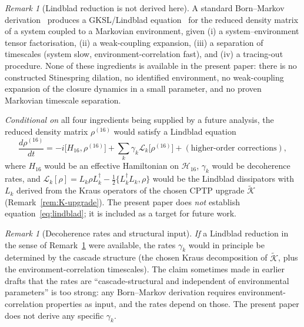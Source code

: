 \documentclass[12pt]{article}
\theoremstyle{definition}
\theoremstyle{remark}
\newtheorem{remark}[theorem]{Remark}
\newcommand{\Hcal}{\mathcal{H}}
\newcommand{\Kcal}{\mathcal{K}}
\begin{document}
\begin{remark}[Lindblad reduction is not derived here]\label{rem:lindblad-conjecture}
A standard Born--Markov derivation~\citep{BreuerPetruccione2002} produces a GKSL/Lindblad equation~\citep{GoriniKossakowskiSudarshan1976,Lindblad1976} for the reduced density matrix of a system coupled to a Markovian environment, given (i) a system--environment tensor factorisation, (ii) a weak-coupling expansion, (iii) a separation of timescales (system slow, environment-correlation fast), and (iv) a tracing-out procedure. None of these ingredients is available in the present paper: there is no constructed Stinespring dilation, no identified environment, no weak-coupling expansion of the closure dynamics in a small parameter, and no proven Markovian timescale separation.

\emph{Conditional on} all four ingredients being supplied by a future analysis, the reduced density matrix $\rho^{(16)}$ would satisfy a Lindblad equation
\begin{equation}\label{eq:lindblad}
    \frac{d \rho^{(16)}}{dt} = -i\bigl[H_{16}, \rho^{(16)}\bigr] + \sum_{k} \gamma_k \mathcal{L}_k\bigl[\rho^{(16)}\bigr] + (\text{higher-order corrections}),
\end{equation}
where $H_{16}$ would be an effective Hamiltonian on $\Hcal_{16}$, $\gamma_k$ would be decoherence rates, and $\mathcal{L}_k[\rho] = L_k \rho L_k^\dagger - \tfrac12 \{L_k^\dagger L_k, \rho\}$ would be the Lindblad dissipators with $L_k$ derived from the Kraus operators of the chosen CPTP upgrade $\widetilde{\Kcal}$ (Remark~\ref{rem:K-upgrade}). The present paper does \emph{not} establish equation~\eqref{eq:lindblad}; it is included as a target for future work.
\end{remark}

\begin{remark}[Decoherence rates and structural input]\label{rem:rates-conjecture}
\emph{If} a Lindblad reduction in the sense of Remark~\ref{rem:lindblad-conjecture} were available, the rates $\gamma_k$ would in principle be determined by the cascade structure (the chosen Kraus decomposition of $\widetilde{\Kcal}$, plus the environment-correlation timescales). The claim sometimes made in earlier drafts that the rates are ``cascade-structural and independent of environmental parameters'' is too strong: any Born--Markov derivation requires environment-correlation properties as input, and the rates depend on those. The present paper does not derive any specific $\gamma_k$.
\end{remark}
\end{document}
